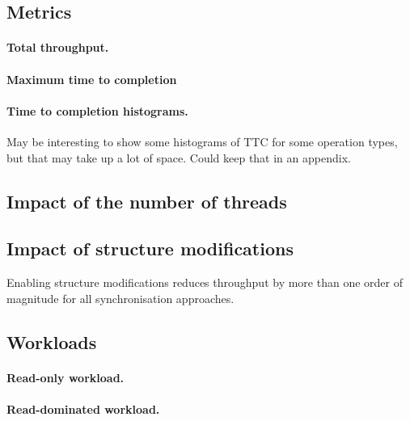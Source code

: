 \documentclass[12pt,a4paper,oneside,openright]{report}
\begin{document}
\subsection{Metrics}
\label{sec:eval:metrics}

\paragraph{Total throughput.}

\paragraph{Maximum time to completion}

\paragraph{Time to completion histograms.}
May be interesting to show some histograms of TTC for some operation
types, but that may take up a lot of space. Could keep that in an
appendix.

\subsection{Impact of the number of threads}
\label{sec:eval:impact-numb-thre}

\subsection{Impact of structure modifications}
\label{sec:impl:impact-struct-modif}

Enabling structure modifications reduces throughput by more than one
order of magnitude for all synchronisation approaches.

\subsection{Workloads}
\label{sec:impl:workloads}

\paragraph{Read-only workload.}
\label{sec:impl:read-only-workload}

\paragraph{Read-dominated workload.}
\label{sec:eval:read-domin-workl}
\end{document}
